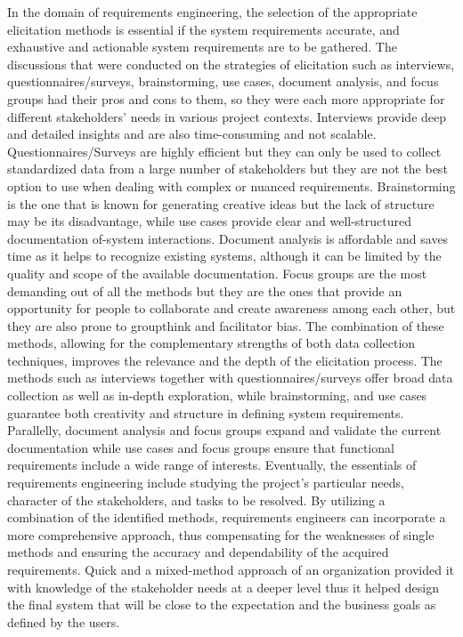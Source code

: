 \documentclass[conference]{IEEEtran}
\begin{document}
In the domain of requirements engineering, the selection of the appropriate elicitation methods is essential if the system requirements accurate, and exhaustive and actionable system requirements are to be gathered. The discussions that were conducted on the strategies of elicitation such as interviews, questionnaires/surveys, brainstorming, use cases, document analysis, and focus groups had their pros and cons to them, so they were each more appropriate for different stakeholders’ needs in various project contexts.
Interviews provide deep and detailed insights and are also time-consuming and not scalable. Questionnaires/Surveys are highly efficient but they can only be used to collect standardized data from a large number of stakeholders but they are not the best option to use when dealing with complex or nuanced requirements. Brainstorming is the one that is known for generating creative ideas but the lack of structure may be its disadvantage, while use cases provide clear and well-structured documentation of-system interactions. Document analysis is affordable and saves time as it helps to recognize existing systems, although it can be limited by the quality and scope of the available documentation. Focus groups are the most demanding out of all the methods but they are the ones that provide an opportunity for people to collaborate and create awareness among each other, but they are also prone to groupthink and facilitator bias.
The combination of these methods, allowing for the complementary strengths of both data collection techniques, improves the relevance and the depth of the elicitation process. The methods such as interviews together with questionnaires/surveys offer broad data collection as well as in-depth exploration, while brainstorming, and use cases guarantee both creativity and structure in defining system requirements. Parallelly, document analysis and focus groups expand and validate the current documentation while use cases and focus groups ensure that functional requirements include a wide range of interests.
Eventually, the essentials of requirements engineering include studying the project's particular needs, character of the stakeholders, and tasks to be resolved. By utilizing a combination of the identified methods, requirements engineers can incorporate a more comprehensive approach, thus compensating for the weaknesses of single methods and ensuring the accuracy and dependability of the acquired requirements. Quick and a mixed-method approach of an organization provided it with knowledge of the stakeholder needs at a deeper level thus it helped design the final system that will be close to the expectation and the business goals as defined by the users.
\end{document}

